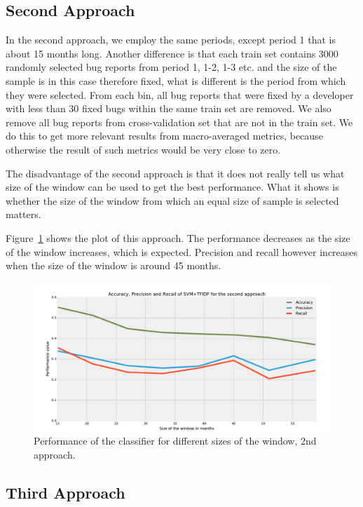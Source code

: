 \subsection{Second Approach}

In the second approach, we employ the same periods, except period 1 that is about 15 months long. Another difference is that each train set contains 3000 randomly selected bug reports from period 1, 1-2, 1-3 etc. and the size of the sample is in this case therefore fixed, what is different is the period from which they were selected. From each bin, all bug reports that were fixed by a developer with less than 30 fixed bugs within the same train set are removed. We also remove all bug reports from cross-validation set that are not in the train set. We do this to get more relevant results from macro-averaged metrics, because otherwise the result of such metrics would be very close to zero.

The disadvantage of the second approach is that it does not really tell us what size of the window can be used to get the best performance. What it shows is whether the size of the window from which an equal size of sample is selected matters.

Figure~\ref{fig:window.firefox.2a} shows the plot of this approach. The performance decreases as the size of the window increases, which is expected. Precision and recall however increases when the size of the window is around 45 months.

\begin{figure}[htbp]
    \centering
        \includegraphics[width=\textwidth]{./images/window_size/firefox_2a.pdf}
    \caption{Performance of the classifier for different sizes of the window, 2nd approach.}
    \label{fig:window.firefox.2a}
\end{figure}

\subsection{Third Approach}

